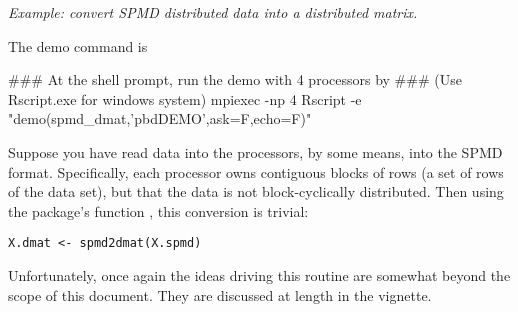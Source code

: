 \emph{Example:  convert SPMD distributed data into a distributed matrix.}

The demo command is
\begin{Command}
### At the shell prompt, run the demo with 4 processors by
### (Use Rscript.exe for windows system)
mpiexec -np 4 Rscript -e "demo(spmd_dmat,'pbdDEMO',ask=F,echo=F)"
\end{Command}

Suppose you have read data into the processors, by some means, into the SPMD format.  Specifically, each processor owns contiguous blocks of rows (a set of rows of the data set), but that the data is not block-cyclically distributed.  Then using the  package's function , this conversion is trivial:

\begin{lstlisting}[language=rr]
X.dmat <- spmd2dmat(X.spmd)
\end{lstlisting}

Unfortunately, once again the ideas driving this routine are somewhat beyond the scope of this document.  They are discussed at length in the  vignette.